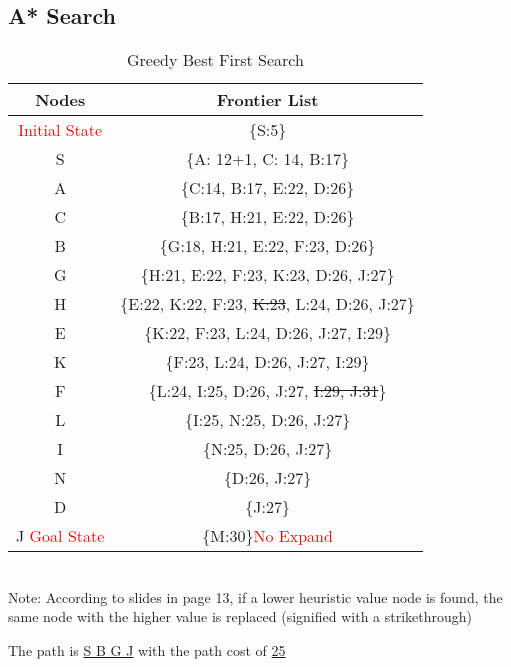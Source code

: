 \documentclass{article}
\begin{document}
	\subsection{A* Search}
    \begin{table}[H]
        \centering
        \caption{Greedy Best First Search}
        \label{tab:table1}
        \begin{tabular}{|c|c|}
            \toprule
            Nodes & Frontier List\\
            \midrule
            \textcolor{red}{Initial State} & \{S:5\}\\
            \hline
            S & \{A: 12+1, C: 14, B:17\}\\
            \hline
            A & \{C:14, B:17, E:22, D:26\}\\
            \hline
            C & \{B:17, H:21, E:22, D:26\}\\
            \hline
            B & \{G:18, H:21, E:22, F:23, D:26\}\\
            \hline
            G & \{H:21, E:22, F:23, K:23, D:26, J:27\}\\
            \hline
            H & \{E:22, K:22, F:23, \st{K:23}, L:24, D:26, J:27\}\\
            \hline
            E & \{K:22, F:23, L:24, D:26, J:27, I:29\}\\
            \hline
            K & \{F:23, L:24, D:26, J:27, I:29\}\\
            \hline
            F & \{L:24, I:25, D:26, J:27, \st{I:29, J:31}\}\\
            \hline
            L & \{I:25, N:25, D:26, J:27\}\\
            \hline
            I & \{N:25, D:26, J:27\}\\
            \hline
            N & \{D:26, J:27\}\\
            \hline
            D & \{J:27\}\\
            \hline
            J \textcolor{red}{Goal State} & \{M:30\}\textcolor{red}{No Expand}\\
            \hline
        \end{tabular}
        \\
        Note: According to slides in page 13, if a lower heuristic value node is found, the same node with the higher value is replaced (signified with a strikethrough)
    \end{table}
    \vspace{-0.5pc}
        The path is \underline{S B G J} with the path cost of \underline{25}
\end{document}
